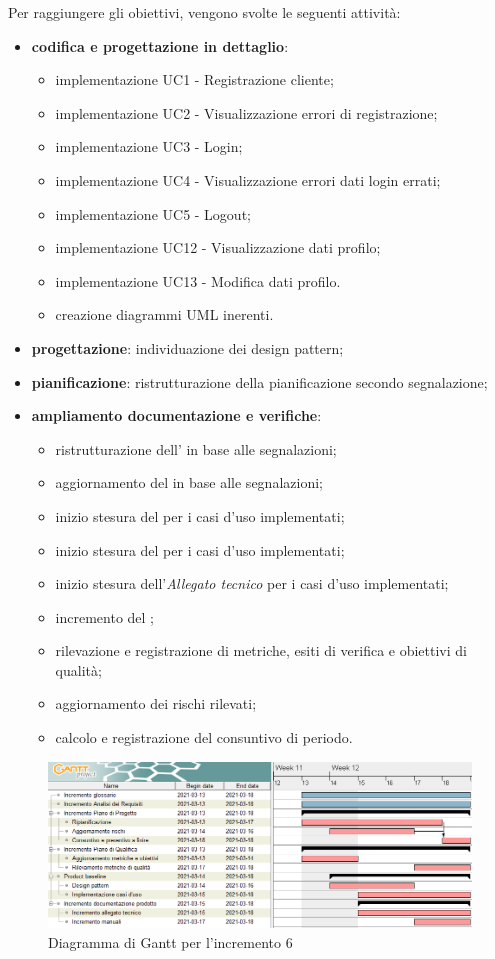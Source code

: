 Per raggiungere gli obiettivi, vengono svolte le seguenti attività:
\begin{itemize}

\item \textbf{codifica e progettazione in dettaglio}:
\begin{itemize}
\item implementazione UC1 - Registrazione cliente;
\item implementazione UC2 - Visualizzazione errori di registrazione;
\item implementazione UC3 - Login;
\item implementazione UC4 - Visualizzazione errori dati login errati;
\item implementazione UC5 - Logout;
\item implementazione UC12 - Visualizzazione dati profilo;
\item implementazione UC13 - Modifica dati profilo.
\item creazione diagrammi UML inerenti.

\end{itemize}

\item \textbf{progettazione}: individuazione dei design pattern;

\item \textbf{pianificazione}: ristrutturazione della pianificazione secondo segnalazione;

\item \textbf{ampliamento documentazione e verifiche}:
\begin{itemize}
\item ristrutturazione dell' in base alle segnalazioni;
\item aggiornamento del  in base alle segnalazioni;
\item inizio stesura del \MU{} per i casi d'uso implementati;
\item inizio stesura del \MM{} per i casi d'uso implementati;
\item inizio stesura dell'\textit{Allegato tecnico} per i casi d'uso implementati;
\item incremento del ;
\item rilevazione e registrazione di metriche, esiti di verifica e obiettivi di qualità;
\item aggiornamento dei rischi rilevati;
\item calcolo e registrazione del consuntivo di periodo.
\end{itemize}

\end{itemize}
\begin{figure}[H]
\centering

\centerline{\includegraphics[scale=0.6]{res/Pianificazione/Fasi/CodificaIncrementi/ganttIncremento6}}
\caption{Diagramma di Gantt per l'incremento 6}
\end{figure}